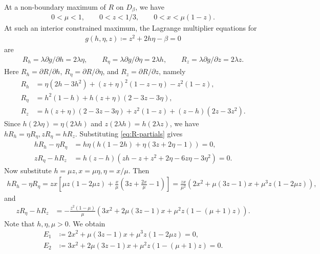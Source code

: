 \documentclass[10pt,a4paper]{article}
\begin{document}
    At a non-boundary maximum of $R$ on $D_\beta$, we have
    \begin{align*}
      0<\mu<1,
      \qquad 0<z<1/3,
      \qquad 0<x<\mu(1-z).
    \end{align*}
    At such an interior constrained maximum, the Lagrange multiplier equations for
    \begin{align*}
      g(h,\eta,z)\coloneqq z^2+2h\eta-\beta=0
    \end{align*}
    are
    \begin{align*}
      R_h=\lambda\partial g/\partial h=2\lambda\eta,
      \qquad
      R_\eta=\lambda\partial g/\partial \eta=2\lambda h,
      \qquad
      R_z=\lambda\partial g/\partial z=2\lambda z.
    \end{align*}
    Here $R_h=\partial R/\partial h$, $R_\eta=\partial R/\partial\eta$, and
    $R_z=\partial R/\partial z$, namely
    \begin{align}\label{eq:R-partials}
      R_h&=\eta(2h-3h^2)+(z+\eta)^2(1-z-\eta)-z^2(1-z),\\
      R_\eta&=h^2(1-h)+h(z+\eta)(2-3z-3\eta),\\
      R_z&=h(z+\eta)(2-3z-3\eta)+z^2(1-z)+(z-h)(2z-3z^2).
    \end{align}
    Since $h(2\lambda\eta)=\eta(2\lambda h)$ and
    $z(2\lambda h)=h(2\lambda z)$, we have $hR_h=\eta R_\eta, zR_\eta=hR_z.$
    Substituting  \eqref{eq:R-partials} gives
    \begin{align*}
      hR_h-\eta R_\eta
      &=h\eta\left(h(1-2h)+\eta(3z+2\eta-1)\right)=0,\\
      zR_\eta-hR_z
      &=h(z-h)\left(zh-z+z^2+2\eta-6z\eta-3\eta^2\right)=0.
    \end{align*}
     Now substitute
    $h=\mu z, x=\mu\eta, \eta=x/\mu.$
    Then
    \begin{align*}
      hR_h-\eta R_\eta
      =zx\left[
        \mu z(1-2\mu z)+\frac{x}{\mu}
          \left(3z+\frac{2x}{\mu}-1\right)\right]
      =\frac{zx}{\mu^2}
        \left(2x^2+\mu(3z-1)x+\mu^3z(1-2\mu z)\right),
    \end{align*}
    and
    \begin{align*}
      zR_\eta-hR_z
      &=-\frac{z^2(1-\mu)}{\mu}
        \left(3x^2+2\mu(3z-1)x+\mu^2z(1-(\mu+1)z)\right).
    \end{align*}
    Note that $h,\eta, \mu>0$. We obtain
    \begin{align}
      E_1&\coloneqq 2x^2+\mu(3z-1)x+\mu^3z(1-2\mu z)=0,\label{eq:E1}\\
      E_2&\coloneqq 3x^2+2\mu(3z-1)x+\mu^2z(1-(\mu+1)z)=0.\label{eq:E2}
    \end{align}
\end{document}
